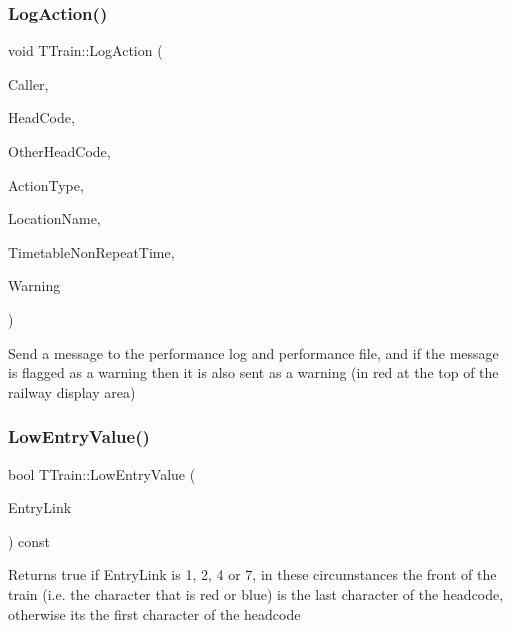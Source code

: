 \subsubsection{\texorpdfstring{Log\+Action()}{LogAction()}}
{\footnotesize\ttfamily void T\+Train\+::\+Log\+Action (\begin{DoxyParamCaption}\item[{int}]{Caller,  }\item[{Ansi\+String}]{Head\+Code,  }\item[{Ansi\+String}]{Other\+Head\+Code,  }\item[{T\+Action\+Type}]{Action\+Type,  }\item[{Ansi\+String}]{Location\+Name,  }\item[{T\+Date\+Time}]{Timetable\+Non\+Repeat\+Time,  }\item[{bool}]{Warning }\end{DoxyParamCaption})\hspace{0.3cm}{\ttfamily [private]}}

Send a message to the performance log and performance file, and if the message is flagged as a warning then it is also sent as a warning (in red at the top of the railway display area) \mbox{\label{class_t_train_ac2f3802b0d193d220ec6d19e2a6fc7ed}} 
\subsubsection{\texorpdfstring{Low\+Entry\+Value()}{LowEntryValue()}}
{\footnotesize\ttfamily bool T\+Train\+::\+Low\+Entry\+Value (\begin{DoxyParamCaption}\item[{int}]{Entry\+Link }\end{DoxyParamCaption}) const\hspace{0.3cm}{\ttfamily [private]}}

Returns true if Entry\+Link is 1, 2, 4 or 7, in these circumstances the front of the train (i.\+e. the character that is red or blue) is the last character of the headcode, otherwise it\textquotesingle{}s the first character of the headcode \mbox{\label{class_t_train_a7a54125a3a5052cb25e17014075a686b}} 
